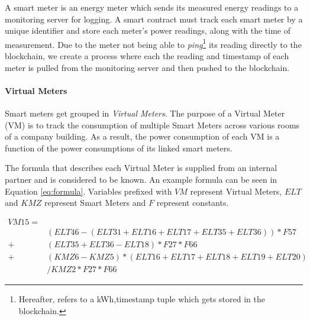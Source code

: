 A smart meter is an energy meter which sends its measured energy readings to a monitoring server for logging. A smart contract must track each smart meter by a unique identifier and store each meter's power readings, along with the time of measurement. Due to the meter not being able to \textit{ping}\footnote{Hereafter, refers to a kWh,timestamp tuple which gets stored in the blockchain.} its reading directly to the blockchain, we create a process where each the reading and timestamp of each meter is pulled from the monitoring server and then pushed to the blockchain. 



\paragraph{Virtual Meters}

Smart meters get grouped in \textit{Virtual Meters}. The purpose of a Virtual Meter (VM) is to track the consumption of multiple Smart Meters across various rooms of a company building. As a result, the power consumption of each VM is a function of the power consumptions of its linked smart meters. %


The formula that describes each Virtual Meter is supplied from an internal partner and is considered to be known. An example formula can be seen in Equation \ref{eq:formula}. Variables prefixed with $VM$ represent Virtual Meters, $ELT$ and $KMZ$ represent Smart Meters and $F$ represent constants.

\begin{equation} \label{eq:formula}
    \begin{aligned}
        VM15= \\
        & (ELT46-(ELT31+ELT16+ELT17+ELT35+ELT36))*F57
        \\
        + & (ELT35+ELT36-ELT18)*F27*F66
        \\
        + & (KMZ6-KMZ5)*(ELT16+ELT17+ELT18+ELT19+ELT20)\\
        & /KMZ2*F27*F66 
    \end{aligned}
\end{equation}

